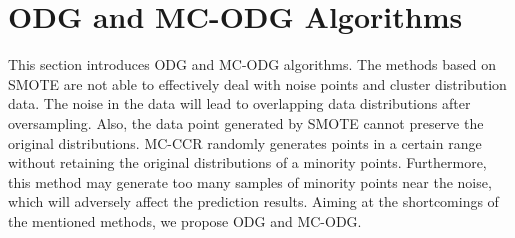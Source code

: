 \documentclass[ida]{iosart2x}
\begin{document}
\section{ODG and MC-ODG Algorithms}
This section introduces ODG and MC-ODG algorithms.
The methods based on SMOTE are not able to effectively deal with noise points and cluster distribution data.
The noise in the data will lead to overlapping data distributions after oversampling.
Also, the data point generated by SMOTE cannot preserve the original distributions.
MC-CCR randomly generates points in a certain range without retaining the original distributions of a minority points.
Furthermore, this method may generate too many samples of 
minority points near the noise, which will adversely affect the prediction results.
Aiming at the shortcomings of the mentioned methods, 
we propose ODG and MC-ODG.
\end{document}
